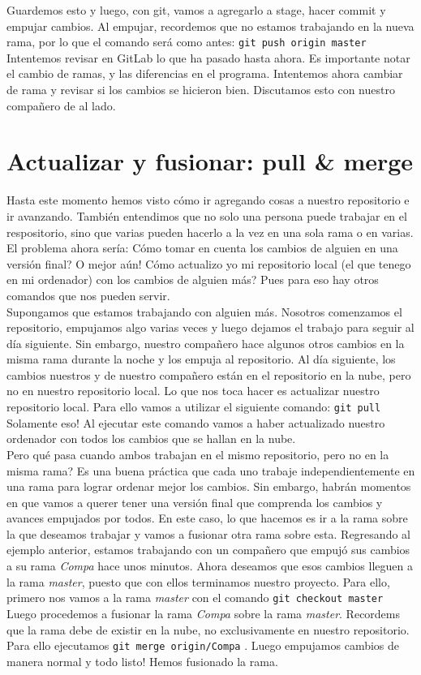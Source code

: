 \documentclass[10pt,letterpaper]{article}
\newcommand{\inlinecode}[1]{
\colorbox{light-gray}{\texttt{#1}}
}
\begin{document}
Guardemos esto y luego, con git, vamos a agregarlo a stage, hacer commit y empujar cambios. Al empujar, recordemos que no estamos trabajando en la nueva rama, por lo que el comando ser\'a como antes: \inlinecode{git push origin master} Intentemos revisar en GitLab lo que ha pasado hasta ahora. Es importante notar el cambio de ramas, y las diferencias en el programa. Intentemos ahora cambiar de rama y revisar si los cambios se hicieron bien. Discutamos esto con nuestro compa\~nero de al lado.

\section{Actualizar y fusionar: pull \& merge}
Hasta este momento hemos visto c\'omo ir agregando cosas a nuestro repositorio e ir avanzando. Tambi\'en entendimos que no solo una persona puede trabajar en el respositorio, sino que varias pueden hacerlo a la vez en una sola rama o en varias. El problema ahora ser\'ia: C\'omo tomar en cuenta los cambios de alguien en una versi\'on final? O mejor a\'un! C\'omo actualizo yo mi repositorio local (el que tenego en mi ordenador) con los cambios de alguien m\'as? Pues para eso hay otros comandos que nos pueden servir.\\

Supongamos que estamos trabajando con alguien m\'as. Nosotros comenzamos el repositorio, empujamos algo varias veces y luego dejamos el trabajo para seguir al d\'ia siguiente. Sin embargo, nuestro compa\~nero hace algunos otros cambios en la misma rama durante la noche y los empuja al repositorio. Al d\'ia siguiente, los cambios nuestros y de nuestro compa\~nero est\'an en el repositorio en la nube, pero no en nuestro repositorio local. Lo que nos toca hacer es actualizar nuestro repositorio local. Para ello vamos a utilizar el siguiente comando: \inlinecode{git pull} Solamente eso! Al ejecutar este comando vamos a haber actualizado nuestro ordenador con todos los cambios que se hallan en la nube.\\

Pero qu\'e pasa cuando ambos trabajan en el mismo repositorio, pero no en la misma rama? Es una buena pr\'actica que cada uno trabaje independientemente en una rama para lograr ordenar mejor los cambios. Sin embargo, habr\'an momentos en que vamos a querer tener una versi\'on final que comprenda los cambios y avances empujados por todos. En este caso, lo que hacemos es ir a la rama sobre la que deseamos trabajar y vamos a fusionar otra rama sobre esta. Regresando al ejemplo anterior, estamos trabajando con un compa\~nero que empuj\'o sus cambios a su rama \emph{Compa} hace unos minutos. Ahora deseamos que esos cambios lleguen a la rama \emph{master}, puesto que con ellos terminamos nuestro proyecto. Para ello, primero nos vamos a la rama \emph{master} con el comando \inlinecode{git checkout master} Luego procedemos a fusionar la rama \emph{Compa} sobre la rama \emph{master}. Recordems que la rama debe de existir en la nube, no exclusivamente en nuestro repositorio. Para ello ejecutamos \inlinecode{git merge origin/Compa}. Luego empujamos cambios de manera normal y todo listo! Hemos fusionado la rama.\\
\end{document}
